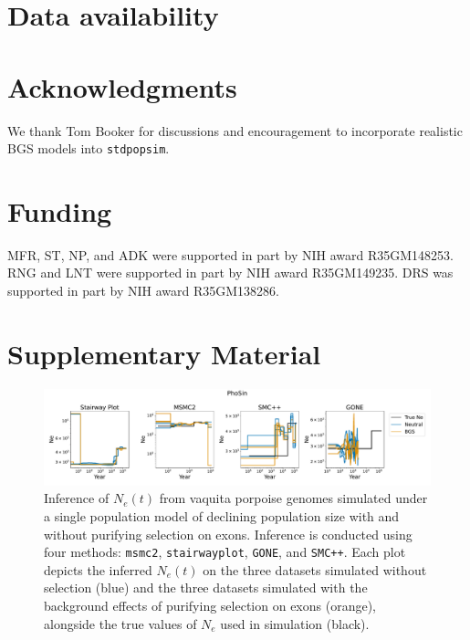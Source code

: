 \documentclass[hidelinks]{article}
\newcommand{\stdpopsim}{\texttt{stdpopsim}\xspace}
\newcommand{\beginsupplement}{%
        \fancyhead[L]{Supplemental Material}
        \setcounter{table}{0}
        \renewcommand{\thetable}{S\arabic{table}}%
        \setcounter{figure}{0}
        \renewcommand{\thefigure}{S\arabic{figure}}%
     }
\newcommand{\msmc}{\texttt{msmc2}\xspace}
\newcommand{\stairway}{\texttt{stairwayplot}\xspace}
\newcommand{\gone}{\texttt{GONE}\xspace}
\newcommand{\smcpp}{\texttt{SMC++}\xspace}
\begin{document}
\section*{Data availability}\label{data_availability}


\section*{Acknowledgments}\label{acknowledgements}
We thank Tom Booker for discussions and encouragement to incorporate realistic BGS models into \stdpopsim.

\section*{Funding}
    \label{funding}
    MFR, ST, NP, and ADK were supported in part by NIH award R35GM148253.
    RNG and LNT were supported in part by NIH award R35GM149235.
    DRS was supported in part by NIH award R35GM138286.

\printbibliography

\clearpage
\beginsupplement

\section*{Supplementary Material}

\begin{figure}[b!]
    \centering
    \includegraphics[width=\textwidth]{figures/PhoSin/Vaquita2Epoch_1R22/estimated_Ne_t_final.pdf}
    \caption{
    \label{fig:vaquita-demography}
    Inference of $N_e(t)$ from vaquita porpoise genomes simulated under a single population 
    model of declining population size \citep{robinson2022critically}
    with and without purifying selection on exons. 
    Inference is conducted using four methods:    
    \msmc \citep{Schiffels2020}, \stairway \citep{liu2020stairway}, \gone \citep{santiago2020recent}, and \smcpp \citep{terhorst2017robust}.
    Each plot depicts the inferred $N_e(t)$ on the three datasets simulated without selection (blue)
    and the three datasets simulated with the background effects of purifying selection on exons (orange),
    alongside the true values of $N_e$ used in simulation (black).
}
\end{figure}
\end{document}

